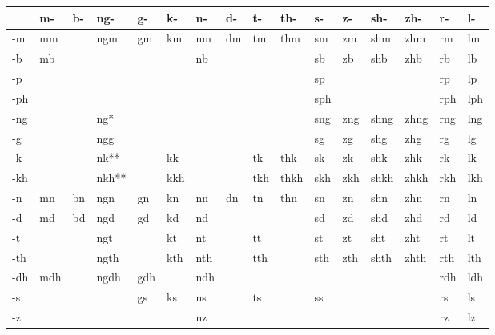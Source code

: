 \begin{table}[H]
\begin{tabular}{ l|l|l|l|l|l|l|l|l|l|l|l|l|l|l|l }
	    & m-   & b-   & ng-  & g-   & k-   & n-   & d-   & t-   & th-  & s-   & z-   & sh-  & zh-  & r-   & l-   \\
	\hline
	-m  & mm   &      & ngm  & gm   & km   & nm   & dm   & tm   & thm  & sm   & zm   & shm  & zhm  & rm   & lm   \\
	-b  & mb   &      &      &      &      & nb   &      &      &      & sb   & zb   & shb  & zhb  & rb   & lb   \\
	-p  &      &      &      &      &      &      &      &      &      & sp   &      &      &      & rp   & lp   \\
	-ph &      &      &      &      &      &      &      &      &      & sph  &      &      &      & rph  & lph  \\
	-ng &      &      & ng*  &      &      &      &      &      &      & sng  & zng  & shng & zhng & rng  & lng  \\
	-g  &      &      & ngg  &      &      &      &      &      &      & sg   & zg   & shg  & zhg  & rg   & lg   \\
	-k  &      &      & nk** &      & kk   &      &      & tk   & thk  & sk   & zk   & shk  & zhk  & rk   & lk   \\
	-kh &      &      & nkh**&      & kkh &      &      & tkh  & thkh & skh  & zkh  & shkh & zhkh & rkh  & lkh  \\
	-n  & mn   & bn   & ngn  & gn   & kn   & nn   & dn   & tn   & thn  & sn   & zn   & shn  & zhn  & rn   & ln   \\
	-d  & md   & bd   & ngd  & gd   & kd   & nd   &      &      &      & sd   & zd   & shd  & zhd  & rd   & ld   \\
	-t  &      &      & ngt  &      & kt   & nt   &      & tt   &      & st   & zt   & sht  & zht  & rt   & lt   \\
	-th &      &      & ngth &      & kth  & nth  &      & tth  &      & sth  & zth  & shth & zhth & rth  & lth  \\
	-dh & mdh  &      & ngdh & gdh  &      & ndh  &      &      &      &      &      &      &      & rdh  & ldh  \\
	-s  &      &      &      & gs   & ks   & ns   &      & ts   &      & ss   &      &      &      & rs   & ls   \\
	-z  &      &      &      &      &      & nz   &      &      &      &      &      &      &      & rz   & lz   \\

\end{tabular}
\end{table}
